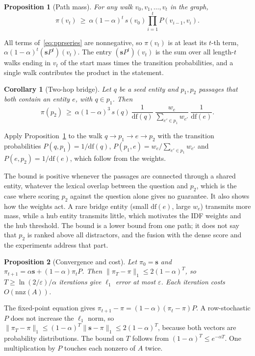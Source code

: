 \documentclass[a4paper,fleqn]{cas-sc}
\newtheorem{proposition}{Proposition}
\newtheorem{corollary}{Corollary}
\begin{document}
\begin{proposition}[Path mass]\label{prop:path}
For any walk $v_0,v_1,\dots,v_t$ in the graph,
\[\pi(v_t)\ \ge\ \alpha(1-\alpha)^t\,s(v_0)\prod_{i=1}^{t}P(v_{i-1},v_i).\]
\end{proposition}
\begin{pf}
All terms of~\eqref{eq:pprseries} are nonnegative, so $\pi(v_t)$ is at least its $t$-th term, $\alpha(1-\alpha)^t(\mathbf{s}P^t)(v_t)$. The entry $(\mathbf{s}P^t)(v_t)$ is the sum over all length-$t$ walks ending in $v_t$ of the start mass times the transition probabilities, and a single walk contributes the product in the statement.
\end{pf}

\begin{corollary}[Two-hop bridge]\label{cor:bridge}
Let $q$ be a seed entity and $p_1,p_2$ passages that both contain an entity $e$, with $q\in p_1$. Then
\[
\pi(p_2)\ \ge\ \alpha(1-\alpha)^3\, s(q)\ \frac{1}{\mathrm{df}(q)}\ \frac{w_e}{\sum_{e'\in p_1}w_{e'}}\ \frac{1}{\mathrm{df}(e)} .
\]
\end{corollary}
\begin{pf}
Apply Proposition~\ref{prop:path} to the walk $q\to p_1\to e\to p_2$ with the transition probabilities $P(q,p_1)=1/\mathrm{df}(q)$, $P(p_1,e)=w_e/\sum_{e'\in p_1}w_{e'}$ and $P(e,p_2)=1/\mathrm{df}(e)$, which follow from the weights.
\end{pf}

\begin{remark}
The bound is positive whenever the passages are connected through a shared entity, whatever the lexical overlap between the question and $p_2$, which is the case where scoring $p_2$ against the question alone gives no guarantee. It also shows how the weights act. A rare bridge entity (small $\mathrm{df}(e)$, large $w_e$) transmits more mass, while a hub entity transmits little, which motivates the IDF weights and the hub threshold. The bound is a lower bound from one path; it does not say that $p_2$ is ranked above all distractors, and the fusion with the dense score and the experiments address that part.
\end{remark}

\begin{proposition}[Convergence and cost]\label{prop:conv}
Let $\pi_0=\mathbf{s}$ and $\pi_{t+1}=\alpha\mathbf{s}+(1-\alpha)\pi_tP$. Then $\|\pi_T-\pi\|_1\le 2(1-\alpha)^T$, so $T\ge\ln(2/\varepsilon)/\alpha$ iterations give $\ell_1$ error at most $\varepsilon$. Each iteration costs $O(\mathrm{nnz}(A))$.
\end{proposition}
\begin{pf}
The fixed-point equation gives $\pi_{t+1}-\pi=(1-\alpha)(\pi_t-\pi)P$. A row-stochastic $P$ does not increase the $\ell_1$ norm, so $\|\pi_T-\pi\|_1\le(1-\alpha)^T\|\mathbf{s}-\pi\|_1\le 2(1-\alpha)^T$, because both vectors are probability distributions. The bound on $T$ follows from $(1-\alpha)^T\le e^{-\alpha T}$. One multiplication by $P$ touches each nonzero of $A$ twice.
\end{pf}
\end{document}
